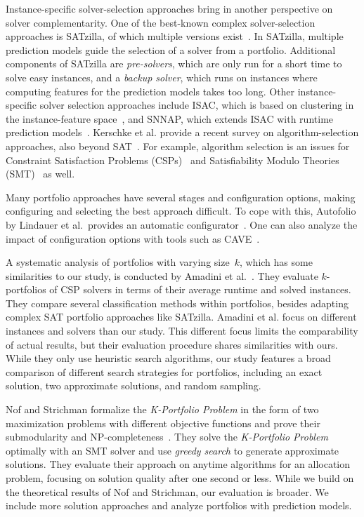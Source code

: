 \documentclass[a4paper,USenglish,pdfa]{lipics-v2021} %
\begin{document}
Instance-specific solver-selection approaches bring in another perspective on solver complementarity.
One of the best-known complex solver-selection approaches is SATzilla, of which multiple versions exist~\cite{xu2008satzilla,xu2012satzilla2012}. 
In SATzilla, multiple prediction models guide the selection of a solver from a portfolio. 
Additional components of SATzilla are \emph{pre-solvers}, which are only run for a short time to solve easy instances, and a \emph{backup solver}, which runs on instances where computing features for the prediction models takes too long.
Other instance-specific solver selection approaches include ISAC, which is based on clustering in the instance-feature space~\cite{Kadioglu:2010:ISAC}, and SNNAP, which extends ISAC with runtime prediction models~\cite{Collautti:2013:SNNAP}.
Kerschke et al. provide a recent survey on algorithm-selection approaches, also beyond SAT~\cite{kerschke2019automated}.
For example, algorithm selection is an issues for Constraint Satisfaction Problems (CSPs)~\cite{amadini2016extensive,omahony2008using} and Satisfiability Modulo Theories (SMT)~\cite{pimpalkhare2021medleysolver,scott2021machsmt} as well.

Many portfolio approaches have several stages and configuration options, making configuring and selecting the best approach difficult.
To cope with this, Autofolio by Lindauer et al.\ provides an automatic configurator~\cite{lindauer2015autofolio}.
One can also analyze the impact of configuration options with tools such as CAVE~\cite{biedenkapp2018cave}.

A systematic analysis of portfolios with varying size~$k$, which has some similarities to our study, is conducted by Amadini et al.~\cite{amadini2014empirical,amadini2016extensive}.
They evaluate $k$-portfolios of CSP solvers in terms of their average runtime and solved instances. 
They compare several classification methods within portfolios, besides adapting complex SAT portfolio approaches like SATzilla. 
Amadini et al. focus on different instances and solvers than our study.
This different focus limits the comparability of actual results, but their evaluation procedure shares similarities with ours.
While they only use heuristic search algorithms, our study features a broad comparison of different search strategies for portfolios, including an exact solution, two approximate solutions, and random sampling. 

Nof and Strichman formalize the \emph{K-Portfolio Problem} in the form of two maximization problems with different objective functions and prove their submodularity and NP-completeness~\cite{nof2020real}. 
They solve the \emph{K-Portfolio Problem} optimally with an SMT solver and use \emph{greedy search} to generate approximate solutions.
They evaluate their approach on anytime algorithms for an allocation problem, focusing on solution quality after one second or less. 
While we build on the theoretical results of Nof and Strichman, our evaluation is broader. 
We include more solution approaches and analyze portfolios with prediction models.
\end{document}
